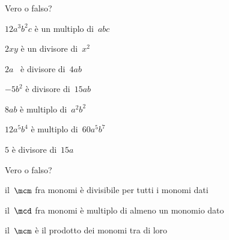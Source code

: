 \subsubsection*{}

\begin{esercizio}
 \label{ese:9.43}
Vero o falso?

\TabPositions{9cm}
\begin{enumeratea}
\item \(12a^{3}b^{2}c\) è un multiplo di~\(abc\) \tab\boxV\quad\boxF
\item \(2xy\) è un divisore di~\(x^{2}\) \tab\boxV\quad\boxF
\item \(2a\) \ è divisore di~\(4ab\) \tab\boxV\quad\boxF
\item \(-5b^{2}\) è divisore di~\(15ab\) \tab\boxV\quad\boxF
\item \(8ab\) è multiplo di~\(a^{2}b^{2}\) \tab\boxV\quad\boxF
\item \(12a^{5}b^{4}\) è multiplo di~\(60a^{5}b^{7}\) \tab\boxV\quad\boxF
\item \(5\) è divisore di~\(15a\) \tab\boxV\quad\boxF
\end{enumeratea}
\end{esercizio}

\begin{esercizio}
 \label{ese:9.44}
Vero o falso?

\TabPositions{10cm}
\begin{enumeratea}
\item il~\(\mcm\) fra monomi è divisibile per tutti i monomi dati 
\tab\boxV\quad\boxF
\item il~\(\mcd\) fra monomi è multiplo di almeno un monomio dato 
\tab\boxV\quad\boxF
\item il~\(\mcm\) è il prodotto dei monomi tra di loro \tab\boxV\quad\boxF
\end{enumeratea}
\end{esercizio}

\newpage %

